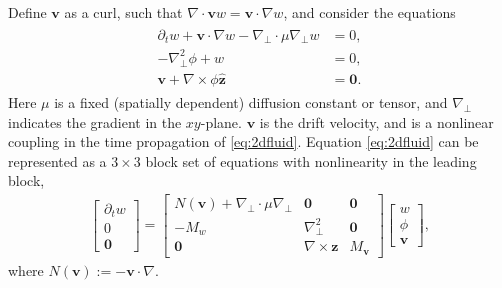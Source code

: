 \documentclass[review]{siamart}
\begin{document}
Define $\mathbf{v}$ as a curl, such that $\nabla \cdot\mathbf{v}w =
\mathbf{v}\cdot\nabla w$, and
consider the equations
%
\begin{align}\label{eq:2dfluid}
\begin{split}
\partial_t w + \mathbf{v}\cdot\nabla w - \nabla_\perp \cdot\mu\nabla_\perp w & = 0, \\
-\nabla_\perp^2\phi + w & = 0, \\
\mathbf{v} + \nabla \times \phi\hat{\mathbf{z}} & = \mathbf{0}.
\end{split}
\end{align}
%
Here $\mu$ is a fixed (spatially dependent) diffusion constant or tensor, and $\nabla_\perp$
indicates the gradient in the $xy$-plane. $\mathbf{v}$ is the drift velocity, and is a nonlinear
coupling in the time propagation of \eqref{eq:2dfluid}. Equation \eqref{eq:2dfluid} can
be represented as a $3\times 3$ block set of equations with nonlinearity in the leading block,
%
\begin{align}\label{eq:block_khi}
\begin{bmatrix} \partial_t w \\ 0 \\ \mathbf{0}\end{bmatrix} =
\begin{bmatrix} {N}(\mathbf{v}) + \nabla_\perp \cdot\mu\nabla_\perp &
		\mathbf{0} & \mathbf{0} \\
	-M_w &  \nabla_\perp^2 & \mathbf{0} \\ \mathbf{0} & \nabla\times \mathbf{z} & M_{\mathbf{v}}
\end{bmatrix}
	\begin{bmatrix} w \\ \phi \\ \mathbf{v}\end{bmatrix} ,
\end{align}
%
where $N(\mathbf{v}) := -\mathbf{v}\cdot\nabla$.
\end{document}
